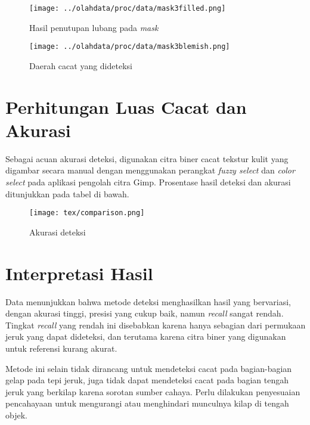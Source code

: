 \documentclass[laporan.tex]{subfiles}
\begin{document}
\begin{figure}[h]
\centering
\texttt{[image: ../olahdata/proc/data/mask3filled.png]}
\caption{Hasil penutupan lubang pada \emph{mask}}
\end{figure}

\begin{figure}[h]
\centering
\texttt{[image: ../olahdata/proc/data/mask3blemish.png]}
\caption{Daerah cacat yang dideteksi}
\end{figure}

\section{Perhitungan Luas Cacat dan Akurasi}

Sebagai acuan akurasi deteksi, digunakan citra biner cacat tekstur kulit yang digambar secara manual dengan menggunakan perangkat \emph{fuzzy select} dan \emph{color select} pada aplikasi pengolah citra Gimp. Prosentase hasil deteksi dan akurasi ditunjukkan pada tabel di bawah.

\begin{figure}[h]
\centering
\texttt{[image: tex/comparison.png]}
\caption{Akurasi deteksi}
\end{figure}

\section{Interpretasi Hasil}

Data menunjukkan bahwa metode deteksi menghasilkan hasil yang bervariasi, dengan akurasi tinggi, presisi yang cukup baik, namun \emph{recall} sangat rendah. Tingkat \emph{recall} yang rendah ini disebabkan karena hanya sebagian dari permukaan jeruk yang dapat dideteksi, dan terutama karena citra biner yang digunakan untuk referensi kurang akurat.

Metode ini selain tidak dirancang untuk mendeteksi cacat pada bagian-bagian gelap pada tepi jeruk, juga tidak dapat mendeteksi cacat pada bagian tengah jeruk yang berkilap karena sorotan sumber cahaya. Perlu dilakukan penyesuaian pencahayaan untuk mengurangi atau menghindari munculnya kilap di tengah objek.


\end{document}
